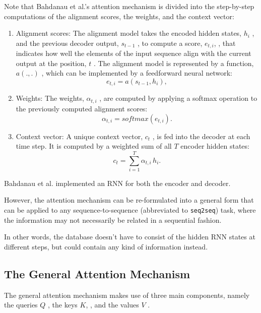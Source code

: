 \documentclass[10pt,a4paper]{article}
\begin{document}
Note that Bahdanau et al.’s attention mechanism is divided into the step-by-step computations of the alignment scores, the weights, and the context vector:
\begin{enumerate}
	\item Alignment scores: The alignment model takes the encoded hidden states, $h_{i}$
	, and the previous decoder output, $s_{t-1}$ 
	, to compute a score, $e_{t,i}$,
	, that indicates how well the elements of the input sequence align with the current output at the position, $t$ 
	. The alignment model is represented by a function, $a(.,.)$ 
	, which can be implemented by a feedforward neural network:
	\begin{equation}
		e_{t,i} = a(s_{t-1}, h_{i}),
	\end{equation}
    \item Weights: The weights, $\alpha_{t,i}$
    , are computed by applying a softmax operation to the previously computed alignment scores:
    \begin{equation}
    	\alpha_{t,i} = softmax(e_{t,i}).
    \end{equation}
    \item Context vector: A unique context vector, $c_{t}$
    , is fed into the decoder at each time step. It is computed by a weighted sum of all $T$ encoder hidden states:
    \begin{equation}
    	c_{t} = \sum_{i=1}^{T} \alpha_{t,i} \, h_{i}.
    \end{equation}

\end{enumerate}

Bahdanau et al. implemented an RNN for both the encoder and decoder. 

However, the attention mechanism can be re-formulated into a general form that can be applied to any sequence-to-sequence (abbreviated to \verb-seq2seq-) task, where the information may not necessarily be related in a sequential fashion. 

In other words, the database doesn’t have to consist of the hidden RNN states at different steps, but could contain any kind of information instead.

\subsection{The General Attention Mechanism}

	The general attention mechanism makes use of three main components, namely the queries $Q$
	, the keys $K$, 
	, and the values $V$ 
	. 
	
\end{document}
